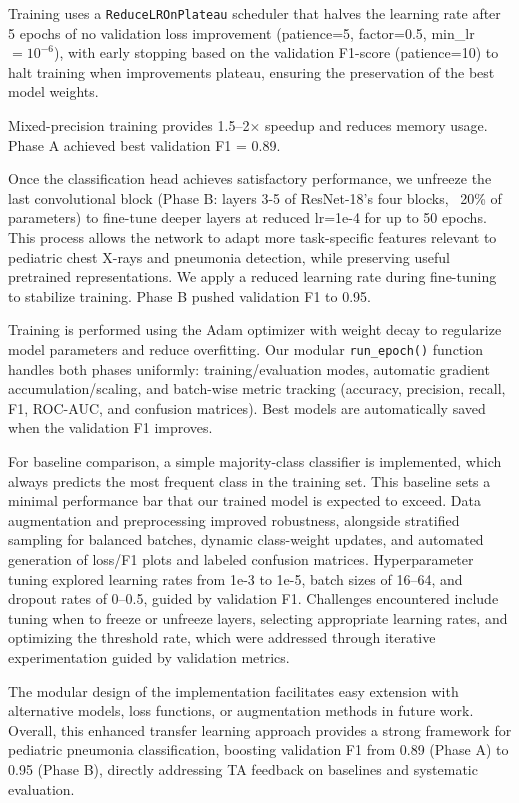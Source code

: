 \documentclass[11pt]{article}
\begin{document}
Training uses a \texttt{ReduceLROnPlateau} scheduler that halves the learning rate 
after 5 epochs of no validation loss improvement (patience=5, factor=0.5, 
min\_lr $= 10^{-6}$), with early stopping based on the validation F1-score 
(patience=10) to halt training when improvements plateau, ensuring the preservation 
of the best model weights. 

Mixed-precision training provides 1.5--2$\times$ speedup and reduces memory usage. 
Phase A achieved best validation F1 = 0.89.



Once the classification head achieves satisfactory performance, we unfreeze the last convolutional block (Phase B: layers 3-5 of ResNet-18's four blocks, ~20\% of parameters) to fine-tune deeper layers at reduced lr=1e-4 for up to 50 epochs. This process allows the network to adapt more task-specific features relevant to pediatric chest X-rays and pneumonia detection, while preserving useful pretrained representations. We apply a reduced learning rate during fine-tuning to stabilize training. Phase B pushed validation F1 to 0.95.

Training is performed using the Adam optimizer with weight decay to regularize model parameters 
and reduce overfitting. Our modular \texttt{run\_epoch()} function handles both phases uniformly: 
training/evaluation modes, automatic gradient accumulation/scaling, and batch-wise metric tracking 
(accuracy, precision, recall, F1, ROC-AUC, and confusion matrices). Best models are automatically 
saved when the validation F1 improves.


For baseline comparison, a simple majority-class classifier is implemented, which always predicts the most frequent class in the training set. This baseline sets a minimal performance bar that our trained model is expected to exceed.
Data augmentation and preprocessing improved robustness, alongside stratified sampling for balanced batches, dynamic class-weight updates, and automated generation of loss/F1 plots and labeled confusion matrices. Hyperparameter tuning explored learning rates from 1e-3 to 1e-5, batch sizes of 16–64, and dropout rates of 0–0.5, guided by validation F1. Challenges encountered include tuning when to freeze or unfreeze layers, selecting appropriate learning rates, and optimizing the threshold rate, which were addressed through iterative experimentation guided by validation metrics.

The modular design of the implementation facilitates easy extension with alternative models, loss functions, or augmentation methods in future work. Overall, this enhanced transfer learning approach provides a strong framework for pediatric pneumonia
classification, boosting validation F1 from 0.89 (Phase A) to 0.95 (Phase B), directly addressing TA feedback on baselines and systematic evaluation.
\end{document}
